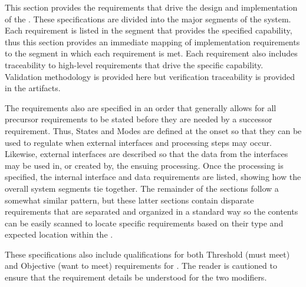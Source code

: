 This section provides the requirements that drive the design and implementation of the \ThisSys.
These specifications are divided into the major segments of the system.
Each requirement is listed in the segment that provides the specified capability, thus this section provides an immediate mapping of implementation  requirements to the segment in which each requirement is met.
Each requirement also includes traceability to high-level requirements that drive the specific capability.
Validation methodology is provided here but verification traceability is provided in the \STS artifacts.


The requirements also are specified in an order that generally allows for all precursor requirements to be stated before they are needed by a successor requirement.
Thus, States and Modes are defined at the onset so that they can be used to regulate when external interfaces and processing steps may occur.
Likewise, external interfaces are described so that the data from the interfaces may be used in, or created by, the ensuing processing.
Once the processing is specified, the internal interface and data requirements are listed, showing how the overall system segments tie together.
The remainder of the sections follow a somewhat similar pattern, but these latter sections contain disparate requirements that are separated and organized in a standard way so the contents can be easily scanned to locate specific requirements based on their type and expected location within the \SSS.

These specifications also include qualifications for both Threshold (must meet) and Objective (want to meet) requirements for \ThisSys.
The reader is cautioned to ensure that the requirement details be understood for the two modifiers.
